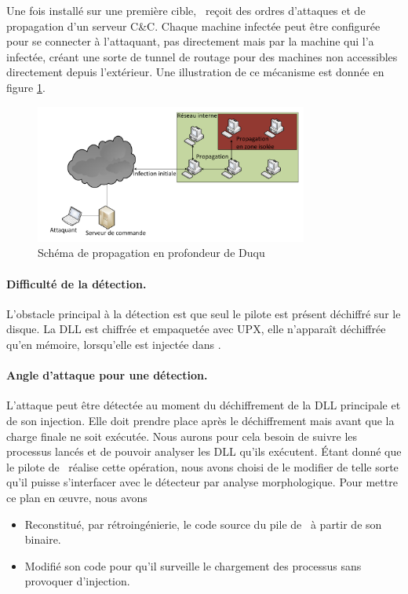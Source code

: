 Une fois installé sur une première cible, \duqu\ reçoit des ordres d'attaques et de propagation d'un serveur C\&C.
Chaque machine infectée peut être configurée pour se connecter à l'attaquant, pas directement mais par la machine qui l'a infectée, créant une sorte de tunnel de routage pour des machines non accessibles directement depuis l'extérieur. Une illustration de ce mécanisme est donnée en figure \ref{fig:propagationDuqu}.

\begin{figure}[h]
\begin{center}
 \includegraphics[width=0.8\textwidth]{supports/duqu/propagationDuqu.pdf}
\end{center}
\caption{Schéma de propagation en profondeur de Duqu}
\label{fig:propagationDuqu}
\end{figure}

\paragraph{Difficulté de la détection.}
L'obstacle principal à la détection est que seul le pilote est présent déchiffré sur le disque.
La DLL est chiffrée et empaquetée avec UPX, elle n'apparaît déchiffrée qu'en mémoire, lorsqu'elle est injectée dans \services.

\paragraph{Angle d'attaque pour une détection.}
L'attaque peut être détectée au moment du déchiffrement de la DLL principale et de son injection.
Elle doit prendre place après le déchiffrement mais avant que la charge finale ne soit exécutée.
Nous aurons pour cela besoin de suivre les processus lancés et de pouvoir analyser les DLL qu'ils exécutent.
Étant donné que le pilote de \duqu\ réalise cette opération, nous avons choisi de le modifier de telle sorte qu'il puisse s'interfacer avec le détecteur par analyse morphologique.
Pour mettre ce plan en \oe uvre, nous avons
\begin{itemize}
 \item Reconstitué, par rétroingénierie, le code source du pile de \duqu\ à partir de son binaire.
 \item Modifié son code pour qu'il surveille le chargement des processus sans provoquer d'injection.
\end{itemize}

